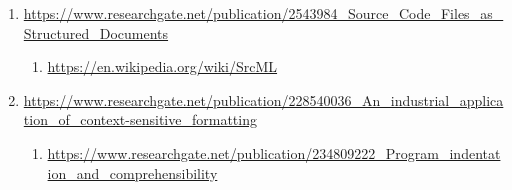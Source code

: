 \begin{sloppypar}
\begin{bluebox}
\begin{enumerate}[leftmargin=*,parsep=0pt]
    \item \url{https://www.researchgate.net/publication/2543984_Source_Code_Files_as_Structured_Documents}
    \begin{enumerate}[nolistsep,topsep=0pt,label=$\star$]
        \item \url{https://en.wikipedia.org/wiki/SrcML}
    \end{enumerate}

    \item \url{https://www.researchgate.net/publication/228540036_An_industrial_application_of_context-sensitive_formatting}
    \begin{enumerate}[nolistsep,topsep=0pt,label=$\star$]
        \item \url{https://www.researchgate.net/publication/234809222_Program_indentation_and_comprehensibility}
    \end{enumerate}

\end{enumerate}
\end{bluebox}
\end{sloppypar}



